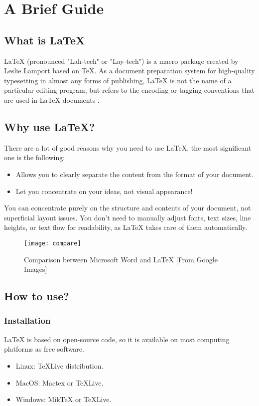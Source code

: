 \chapter{A Brief Guide}
\label{chap:guide}

\section{What is \LaTeX{}} %

\LaTeX{} (pronounced "Lah-tech" or "Lay-tech") is a macro package created by Leslie Lamport based on \TeX{}. As a document preparation system for high-quality typesetting in almost any forms of publishing, \LaTeX{} is not the name of a particular editing program, but refers to the encoding or tagging conventions that are used in \LaTeX{} documents \citep{website:wikipedia,website:latex}.


\section{Why use \LaTeX?}

There are a lot of good reasons why you need to use \LaTeX{}, the most significant one is the following:
\begin{itemize}
    \item Allows you to clearly separate the content from the format of your document.
    \item Let you concentrate on your ideas, not visual appearance!
\end{itemize}

You can concentrate purely on the structure and contents of your document, not superficial layout issues. You don't need to manually adjust fonts, text sizes, line heights, or text flow for readability, as \LaTeX{} takes care of them automatically. \citep{website:wikibook}
\begin{figure}[!htbp]
    \centering
    \texttt{[image: compare]}
    \caption{Comparison between Microsoft Word and \LaTeX{} [From Google Images]}
    \label{fig:compare}
\end{figure}

\section{How to use?} %

\subsection{Installation} %
LaTeX is based on open-source code, so it is available on most computing platforms as free software.
\begin{itemize}
    \item Linux: TeXLive distribution. 
    \item MacOS: Mactex or TeXLive.
    \item Windows: MikTeX or TeXLive. 
\end{itemize}

